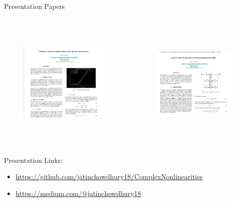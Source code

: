 \begin{frame}{Presentation}
    Papers
    \vspace{-1ex}
    \begin{columns}
        \begin{column}{0.5\linewidth}
            \hspace{-1ex}
            \begin{figure}
                \centering
                \includegraphics[height=2.4in,width=2.3in]{Figures/paper1}
            \end{figure}
        \end{column}
        \begin{column}{0.5\linewidth}
            \begin{figure}
                \centering
                \includegraphics[height=2.4in,width=2.3in]{Figures/paper2}
            \end{figure}
        \end{column}
    \end{columns}
\end{frame}

\begin{frame}{Presentation}
    Links:
    \begin{itemize}
        \item \url{https://github.com/jatinchowdhury18/ComplexNonlinearities}
        \item \url{https://medium.com/@jatinchowdhury18}
    \end{itemize}
\end{frame}

\begin{frame}{}
\end{frame}



